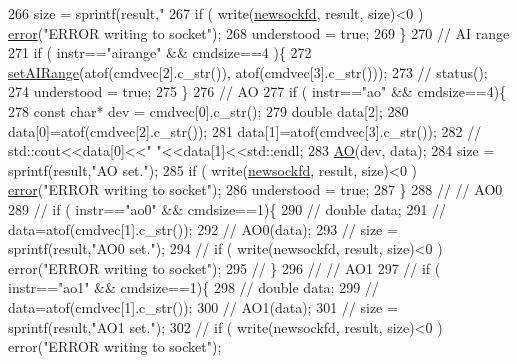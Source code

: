 \begin{DoxyCode}
266     size = sprintf(result,\textcolor{stringliteral}{"%
267     \textcolor{keywordflow}{if} ( write(\hyperlink{classServer__NI6008_a37e3d77925f6c6c9d7dee4dc1c8560d6}{newsockfd}, result, size)<0 ) \hyperlink{classServer__NI6008_a7bcfa6ba683c63b68c624644ccfb8597}{error}(\textcolor{stringliteral}{"ERROR writing to socket"});
268     understood = \textcolor{keyword}{true}; 
269   \}
270   \textcolor{comment}{// AI range }
271   \textcolor{keywordflow}{if} ( instr==\textcolor{stringliteral}{"airange"} && cmdsize==4 )\{
272     \hyperlink{classServer__NI6008_a120ec56f6af12d56683322f56a8d7878}{setAIRange}(atof(cmdvec[2].c\_str()), atof(cmdvec[3].c\_str()));
273     \textcolor{comment}{//    status();}
274     understood = \textcolor{keyword}{true};
275   \}
276   \textcolor{comment}{// AO}
277   \textcolor{keywordflow}{if} ( instr==\textcolor{stringliteral}{"ao"} && cmdsize==4)\{
278     \textcolor{keyword}{const} \textcolor{keywordtype}{char}* dev = cmdvec[0].c\_str();
279     \textcolor{keywordtype}{double} data[2];
280     data[0]=atof(cmdvec[2].c\_str());
281     data[1]=atof(cmdvec[3].c\_str());
282     \textcolor{comment}{//    std::cout<<data[0]<<" "<<data[1]<<std::endl;}
283     \hyperlink{classServer__NI6008_adde2efeb68363f67abb6d76c7ca2d761}{AO}(dev, data);
284     size = sprintf(result,\textcolor{stringliteral}{"AO set."});
285     \textcolor{keywordflow}{if} ( write(\hyperlink{classServer__NI6008_a37e3d77925f6c6c9d7dee4dc1c8560d6}{newsockfd}, result, size)<0 ) \hyperlink{classServer__NI6008_a7bcfa6ba683c63b68c624644ccfb8597}{error}(\textcolor{stringliteral}{"ERROR writing to socket"});
286     understood = \textcolor{keyword}{true};
287   \}
288   \textcolor{comment}{// // AO0}
289   \textcolor{comment}{// if ( instr=="ao0" && cmdsize==1)\{}
290   \textcolor{comment}{//   double data;}
291   \textcolor{comment}{//   data=atof(cmdvec[1].c\_str());}
292   \textcolor{comment}{//   AO0(data);}
293   \textcolor{comment}{//   size = sprintf(result,"AO0 set.");}
294   \textcolor{comment}{//   if ( write(newsockfd, result, size)<0 ) error("ERROR writing to socket");}
295   \textcolor{comment}{// \}}
296   \textcolor{comment}{// // AO1}
297   \textcolor{comment}{// if ( instr=="ao1" && cmdsize==1)\{}
298   \textcolor{comment}{//   double data;}
299   \textcolor{comment}{//   data=atof(cmdvec[1].c\_str());}
300   \textcolor{comment}{//   AO1(data);}
301   \textcolor{comment}{//   size = sprintf(result,"AO1 set.");}
302   \textcolor{comment}{//   if ( write(newsockfd, result, size)<0 ) error("ERROR writing to socket");}
}
\end{DoxyCode}
